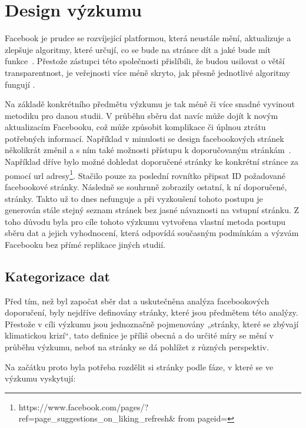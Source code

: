 \chapter{Design výzkumu}
\label{chapter:design-vyzkumu}
    Facebook je prudce se rozvíjející platformou, která neustále mění, aktualizuje a zlepšuje algoritmy, které určují, co se bude na stránce dít a jaké bude mít funkce~\citep{hao_2021}. Přestože zástupci této společnosti přislíbili, že budou usilovat o větší transparentnost, je veřejnosti více méně skryto, jak přesně jednotlivé algoritmy fungují .~\citep{satterfield_2020}
    
    Na základě konkrétního předmětu výzkumu je tak méně či více snadné vyvinout metodiku pro danou studii. V průběhu sběru dat navíc může dojít k novým aktualizacím Facebooku, což může způsobit komplikace či úplnou ztrátu potřebných informací. Například v minulosti se design facebookových stránek několikrát změnil a s ním také možnosti přístupu k doporučovaným stránkám~\citep{facebook_2005, facebook_2020}. Například dříve bylo možné dohledat doporučené stránky ke konkrétní stránce za pomocí url adresy\footnote{https://www.facebook.com/pages/\linebreak?ref=page\_suggestions\_on\_liking\_refresh\&
    from pageid=}. Stačilo pouze za poslední rovnítko připsat ID požadované facebookové stránky. Následně se souhrnně zobrazily ostat\-ní, k ní doporučené, stránky. Takto už to dnes nefunguje a při vyzkoušení tohoto postupu je generován stále stejný seznam stránek bez jasné návaznosti na vstupní stránku.   
    Z toho důvodu byla pro cíle tohoto výzkumu vytvořena vlastní metoda postupu sběru dat a jejich vyhodnocení, která odpovídá současným podmínkám a výzvám Facebooku bez přímé replikace jiných studií.

\section{Kategorizace dat}
\label{sec:kategorizace-dat}
    Před tím, než byl započat sběr dat a uskutečněna analýza facebookových doporučení, byly nejdříve definovány stránky, které jsou předmětem této analýzy. Přestože v cíli výzkumu jsou jednoznačně pojmenovány „stránky, které se zbývají klimatickou krizí“, tato definice je příliš obecná a do určité míry se mění v průběhu výzkumu, neboť na stránky se dá pohlížet z různých perspektiv.
    
    Na začátku proto byla potřeba rozdělit si stránky podle fáze, v které se ve výzkumu vyskytují: 
    
